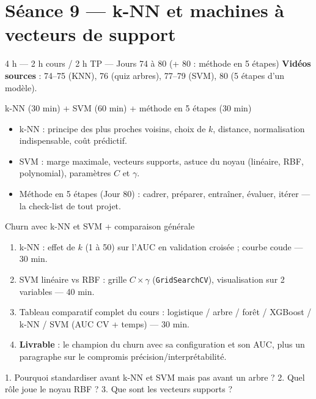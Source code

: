 \documentclass[11pt,a4paper]{article}
\begin{document}
\section*{Séance 9 — k-NN et machines à vecteurs de support}
\begin{seancebox}{4 h — 2 h cours / 2 h TP — Jours 74 à 80 (+ 80 : méthode en 5 étapes)}
\textbf{Vidéos sources} : 74--75 (KNN), 76 (quiz arbres), 77--79 (SVM), 80 (5 étapes d'un modèle).
\end{seancebox}
\begin{coursbox}{k-NN (30 min) + SVM (60 min) + méthode en 5 étapes (30 min)}
\begin{itemize}[nosep]
\item k-NN : principe des plus proches voisins, choix de $k$, distance, normalisation indispensable, coût prédictif.
\item SVM : marge maximale, vecteurs supports, astuce du noyau (linéaire, RBF, polynomial), paramètres $C$ et $\gamma$.
\item Méthode en 5 étapes (Jour 80) : cadrer, préparer, entraîner, évaluer, itérer — la check-list de tout projet.
\end{itemize}
\end{coursbox}
\begin{tpbox}{Churn avec k-NN et SVM + comparaison générale}
\begin{enumerate}[nosep]
\item k-NN : effet de $k$ (1 à 50) sur l'AUC en validation croisée ; courbe coude — 30 min.
\item SVM linéaire vs RBF : grille $C \times \gamma$ (\texttt{GridSearchCV}), visualisation sur 2 variables — 40 min.
\item Tableau comparatif complet du cours : logistique / arbre / forêt / XGBoost / k-NN / SVM (AUC CV + temps) — 30 min.
\item \textbf{Livrable} : le \og champion \fg{} du churn avec sa configuration et son AUC, plus un paragraphe sur le compromis précision/interprétabilité.
\end{enumerate}
\end{tpbox}
\begin{evalbox}
1. Pourquoi standardiser avant k-NN et SVM mais pas avant un arbre ? 2. Quel rôle joue le noyau RBF ? 3. Que sont les vecteurs supports ?
\end{evalbox}
\end{document}
